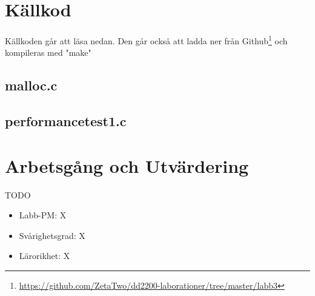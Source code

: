 \documentclass[10pt,a4paper]{article}
\begin{document}
\clearpage
\section{Källkod}
Källkoden går att läsa nedan. Den går också att ladda ner från Github\footnote{\url{https://github.com/ZetaTwo/dd2200-laborationer/tree/master/labb3}} och kompileras med "make"

\subsection{malloc.c}

\clearpage

\subsection{performancetest1.c}

\clearpage

\section{Arbetsgång och Utvärdering}

TODO

\begin{itemize}
\item Labb-PM: X
\item Svårighetsgrad: X
\item Lärorikhet: X
\end{itemize}
\end{document}
